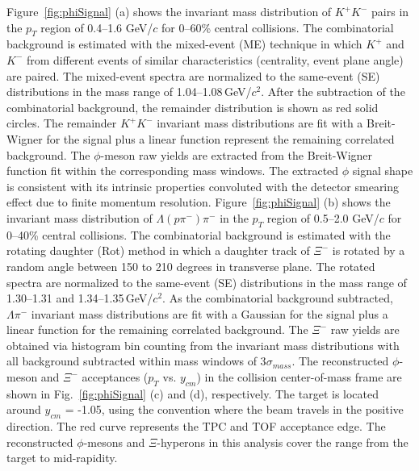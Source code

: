 \documentclass[%
 reprint,	
showpacs,
 amsmath,amssymb,
 aps,
 prc,
]{revtex4-1}
\begin{document}
Figure~\ref{fig:phiSignal} (a) shows the invariant mass distribution of $K^+K^-$ pairs in the $p_{T}$ region of 0.4--1.6 GeV/$c$ for 0--60\% central collisions. The combinatorial background is estimated with the mixed-event (ME) technique in which $K^+$ and $K^-$ from different events of similar characteristics (centrality, event plane angle) are paired. The mixed-event spectra are normalized to the same-event (SE) distributions in the mass range of 1.04--1.08\,GeV/$c^2$. After the subtraction of the combinatorial background, the remainder distribution is shown as red solid circles. The remainder $K^+K^-$ invariant mass distributions are fit with a Breit-Wigner for the signal plus a linear function represent the remaining correlated background. The $\phi$-meson raw yields are extracted from the Breit-Wigner function fit within the corresponding mass windows. The extracted $\phi$ signal shape is consistent with its intrinsic properties convoluted with the detector smearing effect due to finite momentum resolution.
Figure~\ref{fig:phiSignal} (b) shows the invariant mass distribution of $\Lambda(p\pi^-)\pi^-$ in the $p_{T}$ region of 0.5--2.0 GeV/$c$ for 0--40\% central collisions. The combinatorial background is estimated with the rotating daughter (Rot) method in which a daughter track of $\Xi^-$ is rotated by a random angle between 150 to 210 degrees in transverse plane. The rotated spectra are normalized to the same-event (SE) distributions in the mass range of 1.30--1.31 and 1.34--1.35\,GeV/$c^2$. As the combinatorial background subtracted, $\Lambda\pi^-$ invariant mass distributions are fit with a Gaussian for the signal plus a linear function for the remaining correlated background. The $\Xi^-$ raw yields are obtained via histogram bin counting from the invariant mass distributions with all background subtracted within mass windows of 3$\sigma_{mass}$. The reconstructed $\phi$-meson and $\Xi^-$ acceptances ($p_T$ vs. $y_{cm}$) in the collision center-of-mass frame are shown in Fig.~\ref{fig:phiSignal} (c) and (d), respectively.
The target is located around $y_{cm}$ = -1.05, using the convention where the beam travels in the positive direction. The red curve represents the TPC and TOF acceptance edge. The reconstructed $\phi$-mesons and $\Xi$-hyperons in this analysis cover the range from the target to mid-rapidity.
\end{document}
